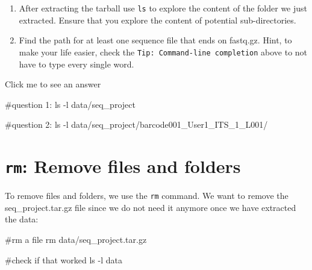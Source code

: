 \documentclass[
  letterpaper,
  DIV=11,
  numbers=noendperiod]{scrreprt}
\newenvironment{Shaded}{}{}
\newcommand{\AttributeTok}[1]{\textcolor[rgb]{0.84,0.23,0.29}{#1}}
\newcommand{\CommentTok}[1]{\textcolor[rgb]{0.42,0.45,0.49}{#1}}
\newcommand{\FunctionTok}[1]{\textcolor[rgb]{0.44,0.26,0.76}{#1}}
\newcommand{\NormalTok}[1]{\textcolor[rgb]{0.14,0.16,0.18}{#1}}
\providecommand{\tightlist}{%
  \setlength{\itemsep}{0pt}\setlength{\parskip}{0pt}}\usepackage{longtable,booktabs,array}
\begin{document}
\begin{tcolorbox}[enhanced jigsaw, rightrule=.15mm, colbacktitle=quarto-callout-caution-color!10!white, colframe=quarto-callout-caution-color-frame, colback=white, arc=.35mm, opacitybacktitle=0.6, coltitle=black, bottomtitle=1mm, breakable, bottomrule=.15mm, leftrule=.75mm, titlerule=0mm, title=\textcolor{quarto-callout-caution-color}{\faFire}\hspace{0.5em}{Exercise}, toprule=.15mm, toptitle=1mm, opacityback=0, left=2mm]

\begin{enumerate}
\def\labelenumi{\arabic{enumi}.}
\tightlist
\item
  After extracting the tarball use \texttt{ls} to explore the content of
  the folder we just extracted. Ensure that you explore the content of
  potential sub-directories.
\item
  Find the path for at least one sequence file that ends on fastq.gz.
  Hint, to make your life easier, check the
  \texttt{Tip:\ Command-line\ completion} above to not have to type
  every single word.
\end{enumerate}

Click me to see an answer

\begin{Shaded}
\begin{Highlighting}[]
\CommentTok{\#question 1:}
\FunctionTok{ls} \AttributeTok{{-}l}\NormalTok{ data/seq\_project}

\CommentTok{\#question 2:}
\FunctionTok{ls} \AttributeTok{{-}l}\NormalTok{ data/seq\_project/barcode001\_User1\_ITS\_1\_L001/}
\end{Highlighting}
\end{Shaded}

\end{tcolorbox}

\section{\texorpdfstring{\texttt{rm}: Remove files and
folders}{rm: Remove files and folders}}\label{rm-remove-files-and-folders}

To remove files and folders, we use the \texttt{rm} command. We want to
remove the seq\_project.tar.gz file since we do not need it anymore once
we have extracted the data:

\begin{Shaded}
\begin{Highlighting}[]
\CommentTok{\#rm a file}
\FunctionTok{rm}\NormalTok{ data/seq\_project.tar.gz}

\CommentTok{\#check if that worked}
\FunctionTok{ls} \AttributeTok{{-}l}\NormalTok{ data}
\end{Highlighting}
\end{Shaded}
\end{document}
